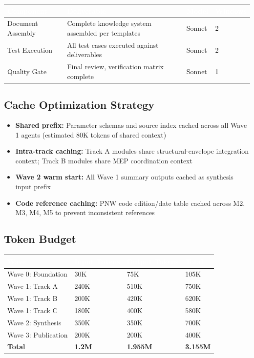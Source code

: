 \documentclass[11pt,letterpaper]{article}
\newcommand{\tableheader}[1]{\textbf{\sffamily\textcolor{white}{#1}}}
\begin{document}
\begin{center}
\begin{tabularx}{\textwidth}{L{3cm}XC{1.5cm}C{1.5cm}}
\toprule
{}
\tableheader{Component} & \tableheader{Deliverable} & \tableheader{Model} & \tableheader{Windows} \\
\midrule
Document Assembly & Complete knowledge system assembled per templates & Sonnet & 2 \\
Test Execution & All test cases executed against deliverables & Sonnet & 2 \\
Quality Gate & Final review, verification matrix complete & Sonnet & 1 \\
\bottomrule
\end{tabularx}
\end{center}

\subsection{Cache Optimization Strategy}

\begin{itemize}[leftmargin=2em]
\item \textbf{Shared prefix:} Parameter schemas and source index cached across all Wave 1 agents (estimated 80K tokens of shared context)
\item \textbf{Intra-track caching:} Track A modules share structural-envelope integration context; Track B modules share MEP coordination context
\item \textbf{Wave 2 warm start:} All Wave 1 summary outputs cached as synthesis input prefix
\item \textbf{Code reference caching:} PNW code edition/date table cached across M2, M3, M4, M5 to prevent inconsistent references
\end{itemize}

\subsection{Token Budget}

\begin{center}
\begin{tabularx}{\textwidth}{L{4cm}C{2cm}C{2cm}C{2cm}}
\toprule
{}
\tableheader{Wave} & \tableheader{Input Tokens} & \tableheader{Output Tokens} & \tableheader{Total} \\
\midrule
Wave 0: Foundation & 30K & 75K & 105K \\
Wave 1: Track A & 240K & 510K & 750K \\
Wave 1: Track B & 200K & 420K & 620K \\
Wave 1: Track C & 180K & 400K & 580K \\
Wave 2: Synthesis & 350K & 350K & 700K \\
Wave 3: Publication & 200K & 200K & 400K \\
\midrule
\textbf{Total} & \textbf{1.2M} & \textbf{1.955M} & \textbf{3.155M} \\
\bottomrule
\end{tabularx}
\end{center}
\end{document}
